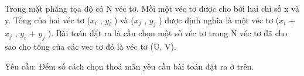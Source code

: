 Trong mặt phẳng tọa độ có N véc tơ. Mỗi một véc tơ được cho bởi hai chỉ số x và y. Tổng của hai véc tơ ($x_{i}$   , $y_{i}$   ) và ($x_{j}$   , $y_{j}$   ) được định nghĩa là một véc tơ ($x_{i}$   + $x_{j}$   , $y_{i}$   + $y_{j}$   ). Bài toán đặt ra là cần chọn một số véc tơ trong N véc tơ đã cho sao cho tổng của các vec tơ đó là véc tơ (U, V).  

   Yêu cầu: Đếm số cách chọn thoả mãn yêu cầu bài toán đặt ra ở trên.